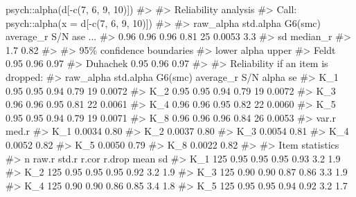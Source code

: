 \documentclass[
  letterpaper,
]{krantz}
\makeatletter
\newenvironment{Shaded}{\begin{snugshade}}{\end{snugshade}}
\newcommand{\CommentTok}[1]{\textcolor[rgb]{0.37,0.37,0.37}{#1}}
\newcommand{\DecValTok}[1]{\textcolor[rgb]{0.68,0.00,0.00}{#1}}
\newcommand{\FunctionTok}[1]{\textcolor[rgb]{0.28,0.35,0.67}{#1}}
\newcommand{\NormalTok}[1]{\textcolor[rgb]{0.00,0.23,0.31}{#1}}
\newcommand{\SpecialCharTok}[1]{\textcolor[rgb]{0.37,0.37,0.37}{#1}}
\newenvironment{kframe}{%
\medskip{}
\setlength{\fboxsep}{.8em}
 \def\at@end@of@kframe{}%
 \ifinner\ifhmode%
  \def\at@end@of@kframe{\end{minipage}}%
  \begin{minipage}{\columnwidth}%
 \fi\fi%
 \def\FrameCommand##1{\hskip\@totalleftmargin \hskip-\fboxsep
 \colorbox{shadecolor}{##1}\hskip-\fboxsep
     \hskip-\linewidth \hskip-\@totalleftmargin \hskip\columnwidth}%
 \MakeFramed {\advance\hsize-\width
   \@totalleftmargin\z@ \linewidth\hsize
   \@setminipage}}%
 {\par\unskip\endMakeFramed%
 \at@end@of@kframe}
\renewenvironment{Shaded}{\begin{kframe}}{\end{kframe}}
\makeatother
\begin{document}
\begin{Shaded}
\begin{Highlighting}[]
\NormalTok{psych}\SpecialCharTok{::}\FunctionTok{alpha}\NormalTok{(d[}\SpecialCharTok{{-}}\FunctionTok{c}\NormalTok{(}\DecValTok{7}\NormalTok{, }\DecValTok{6}\NormalTok{, }\DecValTok{9}\NormalTok{, }\DecValTok{10}\NormalTok{)])}
\CommentTok{\#\textgreater{} }
\CommentTok{\#\textgreater{} Reliability analysis   }
\CommentTok{\#\textgreater{} Call: psych::alpha(x = d[{-}c(7, 6, 9, 10)])}
\CommentTok{\#\textgreater{} }
\CommentTok{\#\textgreater{}   raw\_alpha std.alpha G6(smc) average\_r S/N    ase ...}
\CommentTok{\#\textgreater{}       0.96      0.96    0.96      0.81  25 0.0053  3.3}
\CommentTok{\#\textgreater{}   sd median\_r}
\CommentTok{\#\textgreater{}  1.7     0.82}
\CommentTok{\#\textgreater{} }
\CommentTok{\#\textgreater{}     95\% confidence boundaries }
\CommentTok{\#\textgreater{}          lower alpha upper}
\CommentTok{\#\textgreater{} Feldt     0.95  0.96  0.97}
\CommentTok{\#\textgreater{} Duhachek  0.95  0.96  0.97}
\CommentTok{\#\textgreater{} }
\CommentTok{\#\textgreater{}  Reliability if an item is dropped:}
\CommentTok{\#\textgreater{}     raw\_alpha std.alpha G6(smc) average\_r S/N alpha se}
\CommentTok{\#\textgreater{} K\_1      0.95      0.95    0.94      0.79  19   0.0072}
\CommentTok{\#\textgreater{} K\_2      0.95      0.95    0.94      0.79  19   0.0072}
\CommentTok{\#\textgreater{} K\_3      0.96      0.96    0.95      0.81  22   0.0061}
\CommentTok{\#\textgreater{} K\_4      0.96      0.96    0.95      0.82  22   0.0060}
\CommentTok{\#\textgreater{} K\_5      0.95      0.95    0.94      0.79  19   0.0071}
\CommentTok{\#\textgreater{} K\_8      0.96      0.96    0.96      0.84  26   0.0053}
\CommentTok{\#\textgreater{}      var.r med.r}
\CommentTok{\#\textgreater{} K\_1 0.0034  0.80}
\CommentTok{\#\textgreater{} K\_2 0.0037  0.80}
\CommentTok{\#\textgreater{} K\_3 0.0054  0.81}
\CommentTok{\#\textgreater{} K\_4 0.0052  0.82}
\CommentTok{\#\textgreater{} K\_5 0.0050  0.79}
\CommentTok{\#\textgreater{} K\_8 0.0022  0.82}
\CommentTok{\#\textgreater{} }
\CommentTok{\#\textgreater{}  Item statistics }
\CommentTok{\#\textgreater{}       n raw.r std.r r.cor r.drop mean  sd}
\CommentTok{\#\textgreater{} K\_1 125  0.95  0.95  0.95   0.93  3.2 1.9}
\CommentTok{\#\textgreater{} K\_2 125  0.95  0.95  0.95   0.92  3.2 1.9}
\CommentTok{\#\textgreater{} K\_3 125  0.90  0.90  0.87   0.86  3.3 1.9}
\CommentTok{\#\textgreater{} K\_4 125  0.90  0.90  0.86   0.85  3.4 1.8}
\CommentTok{\#\textgreater{} K\_5 125  0.95  0.95  0.94   0.92  3.2 1.7}

\end{Highlighting}
\end{Shaded}
\end{document}
